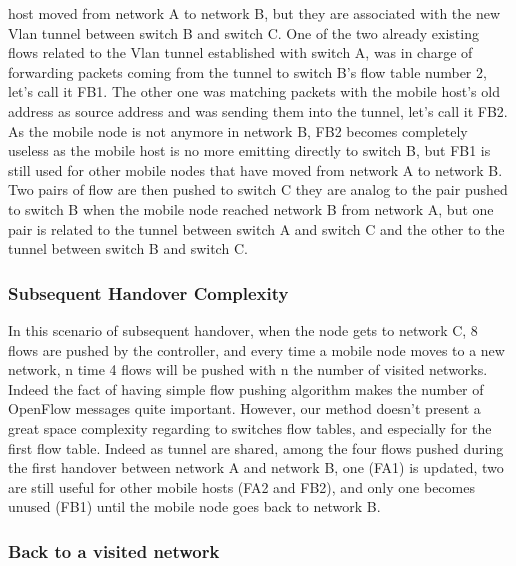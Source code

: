 \documentclass{article}
\begin{document}
host moved from network A to network B, but they are associated with
the new Vlan tunnel between switch B and switch C. One of the two
already existing flows related to the Vlan tunnel established with
switch A, was in charge of forwarding packets coming from the tunnel
to switch B's flow table number 2, let's call it FB1. The other one
was matching packets with the mobile host's old address as source
address and was sending them into the tunnel, let's call it FB2. As
the mobile node is not anymore in network B, FB2 becomes completely
useless as the mobile host is no more emitting directly to switch B,
but FB1 is still used for other mobile nodes that have moved from
network A to network B.\\
\newline
Two pairs of flow are then pushed to switch C they are analog to the
pair pushed to switch B when the mobile node reached network B from
network A, but one pair is related to the tunnel between switch A and
switch C and the other to the tunnel between switch B and switch C.

\subsubsection{Subsequent Handover Complexity}

In this scenario of subsequent handover, when the node gets to network
C, 8 flows are pushed by the controller, and every time a mobile node
moves to a new network, n time 4 flows will be pushed with n the
number of visited networks. Indeed the fact of having simple flow
pushing algorithm makes the number of OpenFlow messages quite
important. However, our method doesn't present a great space
complexity regarding to switches flow tables, and especially for the
first flow table. Indeed as tunnel are shared, among the four flows
pushed during the first handover between network A and network B, one
(FA1) is updated, two are still useful for other mobile hosts (FA2
and FB2), and only one becomes unused (FB1) until the mobile node
goes back to network B.

\subsubsection{Back to a visited network}
\end{document}
